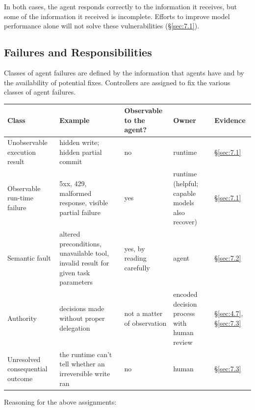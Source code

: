 \documentclass[letterpaper,twocolumn,10pt]{article}
\begin{document}
In both cases, the agent responds correctly to the information it receives, but some of the information it received is incomplete. Efforts to improve model performance alone will not solve these vulnerabilities (\S\ref{sec:7.1}).

\subsection{Failures and Responsibilities}\label{sec:2.3}

Classes of agent failures are defined by the information that agents have and by the availability of potential fixes. Controllers are assigned to fix the various classes of agent failures.

\begin{table}[t]
\centering
\footnotesize
\begin{tabularx}{\textwidth}{XXXXl}
\toprule
\textbf{Class} & \textbf{Example} & \textbf{Observable to the agent?} & \textbf{Owner} & \textbf{Evidence} \\
\midrule
Unobservable execution result & hidden write; hidden partial commit & no & runtime & \S\ref{sec:7.1} \\
Observable run-time failure & 5xx, 429, malformed response, visible partial failure & yes & runtime (helpful; capable models also recover) & \S\ref{sec:7.1} \\
Semantic fault & altered preconditions, unavailable tool, invalid result for given task parameters & yes, by reading carefully & agent & \S\ref{sec:7.2} \\
Authority & decisions made without proper delegation & not a matter of observation & encoded decision process with human review & \S\ref{sec:4.7}, \S\ref{sec:7.3} \\
Unresolved consequential outcome & the runtime can't tell whether an irreversible write ran & no & human & \S\ref{sec:7.3} \\
\bottomrule
\end{tabularx}

\end{table}

Reasoning for the above assignments:
\end{document}
